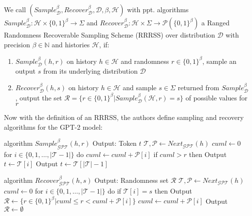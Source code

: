 \begin{definition}
	\label{def:rrrss}
	We call 
	$(Sample_{\mathcal{D}}^\beta, Recover_{\mathcal{D}}^\beta, \mathcal{D}, \beta, \mathcal{H})$ 
	with ppt. algorithms
	$Sample_{\mathcal{D}}^\beta \colon \mathcal{H} \times \{0,1\}^\beta \rightarrow \Sigma$ 
	and 
	$Recover_{\mathcal{D}}^\beta \colon \mathcal{H} \times \Sigma \rightarrow \mathcal{P}(\{0,1\}^\beta)$ 
	a Ranged Randomness Recoverable Sampling Scheme (RRRSS) over distribution $\mathcal{D}$ with precision $\beta \in \mathbb{N}$ and histories $\mathcal{H}$, if:
	
	\begin{enumerate}
		\item $Sample_{\mathcal{D}}^\beta(h, r)$ on history $h \in \mathcal{H}$ and randomness $r \in \{0,1\}^\beta$, sample an output $s$ from its underlying distribution $\mathcal{D}$
		\item $Recover_{\mathcal{D}}^\beta(h, s)$ on history $h \in \mathcal{H}$ and sample $s \in \Sigma$ returned from $Sample_{\mathcal{D}}^\beta$, output the set $\mathcal{R} = \{ r \in \{0,1\}^\beta | Sample_{\mathcal{D}}^\beta(\mathcal{H}, r) = s \}$ of possible values for $r$
	\end{enumerate}
\end{definition}

Now with the definition of an RRRSS, the authors define sampling and recovery algorithms for the GPT-2 model:

\begin{Pseudocode}[caption={
RRRSS Sample Algorithm for GPT, \cite{Meteor2021}.
$Sample$ produces, given a history $h$ and a value $r$, the next token sampled according to $r$ from the distribution for the next token generated by $Next_{\mathcal{GPT}}(h)$.
}]
algorithm $Sample_{\mathcal{GPT}}^\beta(	h, r)$
	Output: Token $t$
	$\mathcal{T}, \mathcal{P} \leftarrow Next_{\mathcal{GPT}}(h)$
	$cuml \leftarrow 0$
	for $i \in \{ 0, 1, \dots, | \mathcal{T} - 1 | \}$ do
		$cuml \leftarrow cuml + \mathcal{P}[i]$
		if $cuml > r$ then
			Output $t \leftarrow \mathcal{T}[i]$
	Output $t \leftarrow \mathcal{T}[|\mathcal{T}|-1]$
\end{Pseudocode}

\begin{Pseudocode}[caption={
RRRSS Recover Algorithm for GPT, \cite{Meteor2021}.
Given a history $h$ and a sample $s$, return a set of possible random values used to generated $s$ according to $h$
}]
algorithm $Recover_{\mathcal{GPT}}^\beta(h, s)$
	Output: Randomness set $\mathcal{R}$
	$\mathcal{T}, \mathcal{P} \leftarrow Next_{\mathcal{GPT}}(h)$
	$cuml \leftarrow 0$
	for $i \in \{ 0, 1, \dots, | \mathcal{T} - 1 | \}$ do
		if $\mathcal{T}[i] = s$ then
			Output $\mathcal{R} \leftarrow \{ r \in \{ 0, 1\}^\beta | cuml \leq r < cuml + \mathcal{P}[i] \}$
		$cuml \leftarrow cuml + \mathcal{P}[i]$
	Output $\mathcal{R} \leftarrow \emptyset$
\end{Pseudocode}

